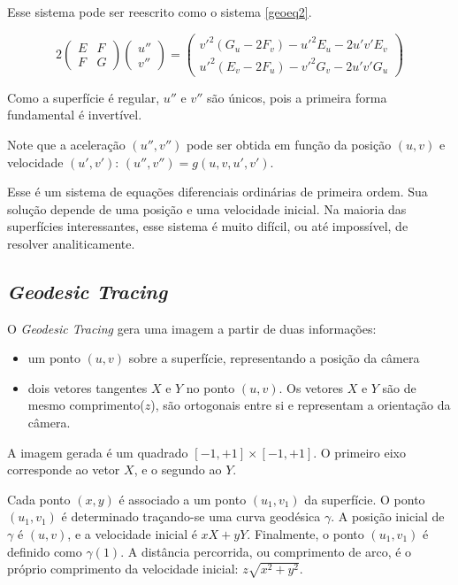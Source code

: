 Esse sistema pode ser reescrito como o sistema \ref{geoeq2}.

\begin{equation}
\label{geoeq2}
        2
        \begin{pmatrix}
            E & F \\
            F & G
        \end{pmatrix}
        \begin{pmatrix}
            u'' \\
            v''
        \end{pmatrix}
        =
        \begin{pmatrix}
            v'^2(G_u-2F_v)-u'^2E_u-2u'v'E_v \\
            u'^2(E_v-2F_u)-v'^2G_v-2u'v'G_u
        \end{pmatrix}
\end{equation}

Como a superfície é regular, $u''$ e $v''$ são únicos, pois a primeira forma
fundamental é invertível.

Note que a aceleração $(u'', v'')$ pode ser obtida em função da posição $(u,v)$
e velocidade $(u', v')$: $(u'', v'') = g(u, v, u', v')$.

Esse é um sistema de equações diferenciais ordinárias de primeira ordem.
Sua solução depende de uma posição e uma velocidade inicial.
Na maioria das superfícies interessantes, esse sistema é muito difícil, ou até impossível,
de resolver analiticamente.

\subsection{\textit{Geodesic Tracing}}
O \textit{Geodesic Tracing} gera uma imagem a partir de duas informações:
\begin{itemize}
    \item um ponto $(u,v)$ sobre a superfície, representando a posição da câmera
    \item dois vetores tangentes $X$ e $Y$ no ponto $(u,v)$.
    Os vetores $X$ e $Y$ são de mesmo comprimento($z$), são ortogonais entre si e
    representam a orientação da câmera.
\end{itemize}

A imagem gerada é um quadrado $[-1, +1] \times [-1, +1]$.
O primeiro eixo corresponde ao vetor $X$, e o segundo ao $Y$.

Cada ponto $(x,y)$ é associado a um ponto $(u_1, v_1)$ da superfície.
O ponto $(u_1, v_1)$ é determinado traçando-se uma curva geodésica $\gamma$.
A posição inicial de $\gamma$ é $(u,v)$, e a velocidade inicial é $xX+yY$.
Finalmente, o ponto $(u_1, v_1)$ é definido como $\gamma(1)$.
A distância percorrida, ou comprimento de arco, é o próprio comprimento
da velocidade inicial: $z\sqrt{x^2+y^2}$.

